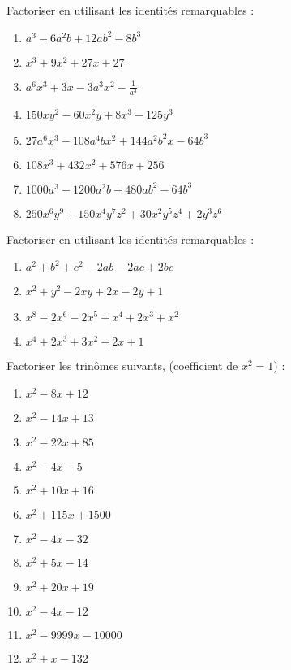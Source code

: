 \begin{exercice} Factoriser en utilisant les identités remarquables :
\begin{multicols}{2}
\begin{enumerate}
\item ${{a}^{3}}-6{{a}^{2}}b+12a{{b}^{2}}-8{{b}^{3}}$
\item ${{x}^{3}}+9{{x}^{2}}+27x+27$
\item ${{a}^{6}}{{x}^{3}}+3x-3{{a}^{3}}{{x}^{2}}-\frac{1}{{{a}^{3}}}$
\item $150x{{y}^{2}}-60{{x}^{2}}y+8{{x}^{3}}-125{{y}^{3}}$
\item $27{{a}^{6}}{{x}^{3}}-108{{a}^{4}}b{{x}^{2}}+144{{a}^{2}}{{b}^{2}}x-64{{b}^{3}}$
\item $108{{x}^{3}}+432{{x}^{2}}+576x+256$
\item $1000{{a}^{3}}-1200{{a}^{2}}b+480a{{b}^{2}}-64{{b}^{3}}$
\item $250{{x}^{6}}{{y}^{9}}+150{{x}^{4}}{{y}^{7}}{{z}^{2}}+30{{x}^{2}}{{y}^{5}}{{z}^{4}}+2{{y}^{3}}{{z}^{6}}$
\end{enumerate}
\end{multicols}
\end{exercice}

\begin{exercice} Factoriser en utilisant les identités remarquables :
\begin{multicols}{2}
\begin{enumerate}
\item ${{a}^{2}}+{{b}^{2}}+{{c}^{2}}-2ab-2ac+2bc$
\item ${{x}^{2}}+{{y}^{2}}-2xy+2x-2y+1$
\item ${{x}^{8}}-2{{x}^{6}}-2{{x}^{5}}+{{x}^{4}}+2{{x}^{3}}+{{x}^{2}}$
\item ${{x}^{4}}+2{{x}^{3}}+3{{x}^{2}}+2x+1$
\end{enumerate}
\end{multicols}
\end{exercice}

\begin{exercice} Factoriser les trinômes suivants, (coefficient de $x^2  = 1$) :
\begin{multicols}{2}
\begin{enumerate}
\item ${{x}^{2}}-8x+12$
\item ${{x}^{2}}-14x+13$
\item ${{x}^{2}}-22x+85$
\item ${{x}^{2}}-4x-5$
\item ${{x}^{2}}+10x+16$
\item ${{x}^{2}}+115x+1500$
\item ${{x}^{2}}-4x-32$
\item ${{x}^{2}}+5x-14$
\item ${{x}^{2}}+20x+19$
\item ${{x}^{2}}-4x-12$
\item ${{x}^{2}}-9999x-10000$
\item ${{x}^{2}}+x-132$
\end{enumerate}
\end{multicols}
\end{exercice}

